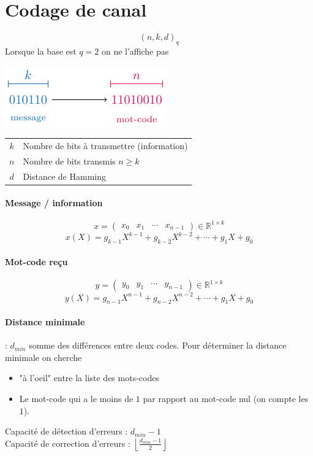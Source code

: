 \documentclass[resume.tex]{subfiles}
\begin{document}
\section{Codage de canal}
$$(n,k,d)_q$$
Lorsque la base est $q=2$ on ne l'affiche pas
\begin{center}
\includegraphics[scale=1,page=1]{drwg_1.pdf}
\end{center}
\begin{center}
\begin{tabular}{c|l}
$k$ & Nombre de bits à transmettre (information)\\
$n$ & Nombre de bits transmis $n\geq k$\\
$d$ & Distance de Hamming
\end{tabular}
\end{center}
\paragraph{Message / information}
$$x=\begin{pmatrix}
x_0 & x_1 & \cdots & x_{n-1}
\end{pmatrix}\in \mathbb{R}^{1\times k}$$
$$x(X)=g_{k-1}X^{k-1}+g_{k-2}X^{k-2}+\cdots+g_1X+g_0$$
\paragraph{Mot-code reçu}
$$y=\begin{pmatrix}
y_0 & y_1 & \cdots & y_{n-1}
\end{pmatrix}\in \mathbb{R}^{1\times k}$$
$$y(X)=g_{n-1}X^{n-1}+g_{n-2}X^{n-2}+\cdots+g_1X+g_0$$
\paragraph{Distance minimale} : $d_{min}$ somme des différences entre deux codes. Pour déterminer la distance minimale on cherche
\begin{itemize}
\item "à l'oeil" entre la liste des mots-codes
\item Le mot-code qui a le moins de $1$ par rapport au mot-code nul (on compte les $1$).
\end{itemize}
Capacité de détection d'erreurs : $d_{min}-1$\\
Capacité de correction d'erreurs : $\left\lfloor\frac{d_{min}-1}{2}\right\rfloor$
\end{document}
